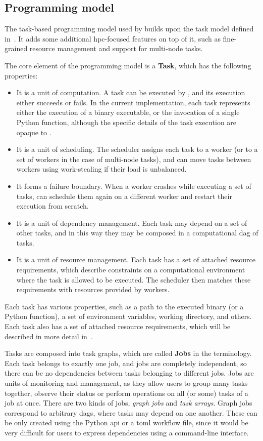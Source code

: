 \subsection{Programming model}
\label{sec:hq-programming-model}
The task-based programming model used by \hyperqueue{} builds upon the task model defined
in~. It adds some additional \gls{hpc}-focused features on top
of it, such as fine-grained resource management and support for multi-node tasks.

The core element of the programming model is a \textbf{Task}, which has the following
properties:
\begin{itemize}
	\item It is a unit of computation. A task can be executed by \hq{}, and its execution
	      either succeeds or fails. In the current implementation, each task represents either the execution
	      of a binary executable, or the invocation of a single Python function, although the specific
	      details of the task execution are opaque to \hyperqueue{}.
	\item It is a unit of scheduling. The \hq{} scheduler assigns each task to a worker (or
	      to a set of workers in the case of multi-node tasks), and can move tasks between workers using
	      work-stealing if their load is unbalanced.
	\item It forms a failure boundary. When a worker crashes while executing a set of tasks,
	      \hq{} can schedule them again on a different worker and restart their execution
	      from scratch.
	\item It is a unit of dependency management. Each task may depend on a set of other tasks, and in this
	      way they may be composed in a computational \gls{dag} of tasks.
	\item It is a unit of resource management. Each task has a set of attached resource requirements, which
	      describe constraints on a computational environment where the task is allowed to be executed. The
	      \hq{} scheduler then matches these requirements with resources provided by
	      workers.
\end{itemize}

Each task has various properties, such as a path to the executed binary (or a Python function), a
set of environment variables, working directory, and others. Each task also has a set of attached
resource requirements, which will be described in more detail in~.

Tasks are composed into task graphs, which are called \textbf{Jobs} in the
\hq{} terminology. Each task belongs to exactly one job, and jobs are completely
independent, so there can be no dependencies between tasks belonging to different jobs. Jobs are
units of monitoring and management, as they allow users to group many tasks together, observe their
status or perform operations on all (or some) tasks of a job at once. There are two kinds of jobs,
\emph{graph jobs} and \emph{task arrays}. Graph jobs correspond to arbitrary
\glspl{dag}, where tasks may depend on one another. These can be only created using the
Python \gls{api} or a \gls{toml} workflow file, since it would be very
difficult for users to express dependencies using a command-line interface.

